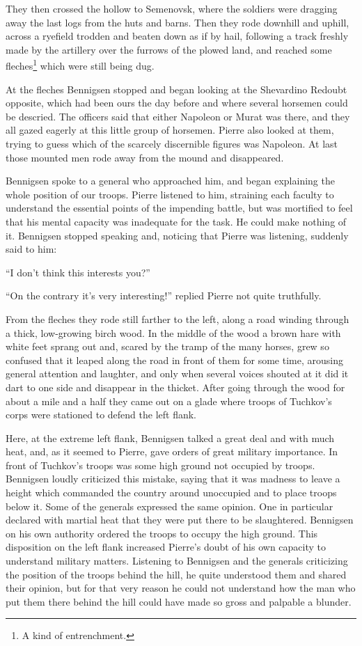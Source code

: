They then crossed the hollow to Semenovsk, where the soldiers
were dragging away the last logs from the huts and barns. Then
they rode downhill and uphill, across a ryefield trodden and
beaten down as if by hail, following a track freshly made by the
artillery over the furrows of the plowed land, and reached some
fleches\footnote{A kind of entrenchment.} which were still being
dug.

At the fleches Bennigsen stopped and began looking at the
Shevardino Redoubt opposite, which had been ours the day before
and where several horsemen could be descried. The officers said
that either Napoleon or Murat was there, and they all gazed
eagerly at this little group of horsemen. Pierre also looked at
them, trying to guess which of the scarcely discernible figures
was Napoleon. At last those mounted men rode away from the mound
and disappeared.

Bennigsen spoke to a general who approached him, and began
explaining the whole position of our troops. Pierre listened to
him, straining each faculty to understand the essential points of
the impending battle, but was mortified to feel that his mental
capacity was inadequate for the task. He could make nothing of
it. Bennigsen stopped speaking and, noticing that Pierre was
listening, suddenly said to him:

``I don't think this interests you?''

``On the contrary it's very interesting!'' replied Pierre not
quite truthfully.

From the fleches they rode still farther to the left, along a
road winding through a thick, low-growing birch wood. In the
middle of the wood a brown hare with white feet sprang out and,
scared by the tramp of the many horses, grew so confused that it
leaped along the road in front of them for some time, arousing
general attention and laughter, and only when several voices
shouted at it did it dart to one side and disappear in the
thicket. After going through the wood for about a mile and a half
they came out on a glade where troops of Tuchkov's corps were
stationed to defend the left flank.

Here, at the extreme left flank, Bennigsen talked a great deal
and with much heat, and, as it seemed to Pierre, gave orders of
great military importance. In front of Tuchkov's troops was some
high ground not occupied by troops. Bennigsen loudly criticized
this mistake, saying that it was madness to leave a height which
commanded the country around unoccupied and to place troops below
it. Some of the generals expressed the same opinion. One in
particular declared with martial heat that they were put there to
be slaughtered. Bennigsen on his own authority ordered the troops
to occupy the high ground. This disposition on the left flank
increased Pierre's doubt of his own capacity to understand
military matters. Listening to Bennigsen and the generals
criticizing the position of the troops behind the hill, he quite
understood them and shared their opinion, but for that very
reason he could not understand how the man who put them there
behind the hill could have made so gross and palpable a blunder.

